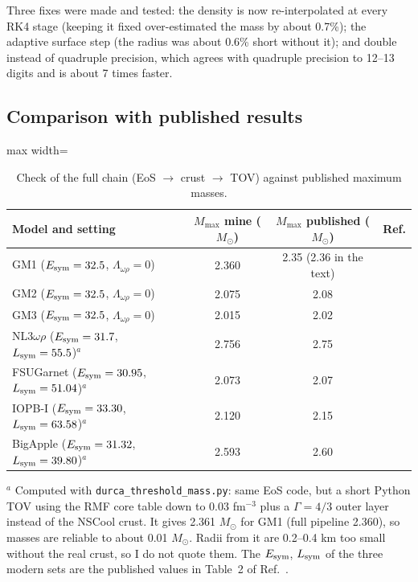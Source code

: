 \documentclass[11pt,a4paper]{article}
\newcommand{\Esym}{E_{\rm sym}}
\newcommand{\Lsym}{L_{\rm sym}}
\newcommand{\Msun}{M_\odot}
\begin{document}
Three fixes were made and tested: the density is now re-interpolated at every RK4 stage (keeping it fixed over-estimated the mass by about 0.7\%); the adaptive surface step (the radius was about 0.6\% short without it); and double instead of quadruple precision, which agrees with quadruple precision to 12--13 digits and is about 7 times faster.

\subsection{Comparison with published results}
\begin{table}[h]
\centering
\caption{Check of the full chain (EoS $\to$ crust $\to$ TOV) against published maximum masses.}\label{tab:mmax}
\begin{adjustbox}{max width=\linewidth}
\begin{tabular}{lccc}
\toprule
Model and setting & $M_{\max}$ mine ($\Msun$) & $M_{\max}$ published ($\Msun$) & Ref.\\
\midrule
GM1 ($\Esym=32.5$, $\Lambda_{\omega\rho}=0$) & 2.360 & 2.35 (2.36 in the text) & \cite{GM1991}\\
GM2 ($\Esym=32.5$, $\Lambda_{\omega\rho}=0$) & 2.075 & 2.08 & \cite{GM1991}\\
GM3 ($\Esym=32.5$, $\Lambda_{\omega\rho}=0$) & 2.015 & 2.02 & \cite{GM1991}\\
NL3$\omega\rho$ ($\Esym=31.7$, $\Lsym=55.5$)$^a$ & 2.756 & 2.75 & \cite{Fortin2016}\\
FSUGarnet ($\Esym=30.95$, $\Lsym=51.04$)$^a$ & 2.073 & 2.07 & \cite{FSUGarnet}\\
IOPB-I ($\Esym=33.30$, $\Lsym=63.58$)$^a$ & 2.120 & 2.15 & \cite{IOPBI}\\
BigApple ($\Esym=31.32$, $\Lsym=39.80$)$^a$ & 2.593 & 2.60 & \cite{BigApple}\\
\bottomrule
\end{tabular}
\end{adjustbox}

\smallskip
{\footnotesize $^a$ Computed with \texttt{durca\_threshold\_mass.py}: same EoS code, but a short Python TOV using the RMF core table down to 0.03 fm$^{-3}$ plus a $\Gamma=4/3$ outer layer instead of the NSCool crust. It gives 2.361 $\Msun$ for GM1 (full pipeline 2.360), so masses are reliable to about 0.01 $\Msun$. Radii from it are 0.2--0.4 km too small without the real crust, so I do not quote them. The $\Esym$, $\Lsym$ of the three modern sets are the published values in Table~2 of Ref.~\cite{Das2021}.}
\end{table}
\end{document}
